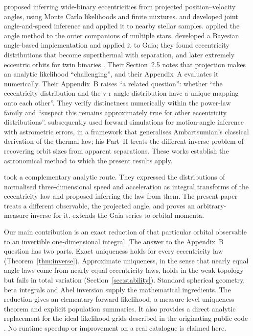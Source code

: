 \documentclass[11pt,a4paper]{article}
\theoremstyle{remark}\newtheorem{remark}[theorem]{Remark}
\begin{document}
\citet{Tokovinin1998} proposed inferring wide-binary eccentricities from projected position--velocity angles, using Monte Carlo likelihoods and finite mixtures. \citet{TokovininKiyaeva2016} and \citet{Tokovinin2020} developed joint angle-and-speed inference and applied it to nearby stellar samples. \citet{Shatsky2001} applied the angle method to the outer companions of multiple stars. \citet{Hwang2022} developed a Bayesian angle-based implementation and applied it to Gaia; they found eccentricity distributions that become superthermal with separation, and later extremely eccentric orbits for twin binaries \citep{Hwang2022twin}. Their Section~2.5 notes that projection makes an analytic likelihood ``challenging'', and their Appendix~A evaluates it numerically. Their Appendix~B raises ``a related question'': whether ``the eccentricity distribution and the v-r angle distribution have a unique mapping onto each other''. They verify distinctness numerically within the power-law family and ``suspect this remains approximately true for other eccentricity distributions''. \citet{Makarov2025} subsequently used forward simulations for motion-angle inference with astrometric errors, in a framework that generalises Ambartsumian's classical derivation of the thermal law; his Part~II \citep{Makarov2025b} treats the different inverse problem of recovering orbit sizes from apparent separations. These works establish the astronomical method to which the present results apply.

\citet{Benisty2022} took a complementary analytic route. They expressed the distributions of normalised three-dimensional speed and acceleration as integral transforms of the eccentricity law and proposed inferring the law from them. The present paper treats a different observable, the projected angle, and proves an arbitrary-measure inverse for it. \citet{Makarov2025c} extends the Gaia series to orbital momenta.

Our main contribution is an exact reduction of that particular orbital observable to an invertible one-dimensional integral. The answer to the Appendix~B question has two parts. Exact uniqueness holds for every eccentricity law (Theorem~\ref{thm:inverse}). Approximate uniqueness, in the sense that nearly equal angle laws come from nearly equal eccentricity laws, holds in the weak topology but fails in total variation (Section~\ref{sec:stability}). Standard spherical geometry, beta integrals and Abel inversion supply the mathematical ingredients. The reduction gives an elementary forward likelihood, a measure-level uniqueness theorem and explicit population summaries. It also provides a direct analytic replacement for the ideal likelihood grids described in the originating public code \citep{HwangCode}. No runtime speedup or improvement on a real catalogue is claimed here.
\end{document}
